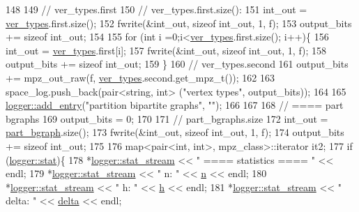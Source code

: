 \begin{DoxyCode}
148 
149   \textcolor{comment}{// ver\_types.first}
150   \textcolor{comment}{// ver\_types.first.size():}
151   int\_out = \hyperlink{classmarked__graph__compressed_af446cc5e23c241a92b76642fd5ebc403}{ver\_types}.first.size();
152   fwrite(&int\_out, \textcolor{keyword}{sizeof} int\_out, 1, f);
153   output\_bits += \textcolor{keyword}{sizeof} int\_out;
154 
155   \textcolor{keywordflow}{for} (\textcolor{keywordtype}{int} i =0;i<\hyperlink{classmarked__graph__compressed_af446cc5e23c241a92b76642fd5ebc403}{ver\_types}.first.size(); i++)\{
156     int\_out = \hyperlink{classmarked__graph__compressed_af446cc5e23c241a92b76642fd5ebc403}{ver\_types}.first[i];
157     fwrite(&int\_out, \textcolor{keyword}{sizeof} int\_out, 1, f);
158     output\_bits += \textcolor{keyword}{sizeof} int\_out;
159   \}
160   \textcolor{comment}{// ver\_types.second}
161   output\_bits += mpz\_out\_raw(f, \hyperlink{classmarked__graph__compressed_af446cc5e23c241a92b76642fd5ebc403}{ver\_types}.second.get\_mpz\_t());
162 
163   space\_log.push\_back(pair<string, int> (\textcolor{stringliteral}{"vertex types"}, output\_bits));
164 
165   \hyperlink{classlogger_a710163deb17bc81f70d53d285b8ac9ac}{logger::add\_entry}(\textcolor{stringliteral}{"partition bipartite graphs"}, \textcolor{stringliteral}{""});
166   
167 
168   \textcolor{comment}{// ==== part bgraphs}
169   output\_bits = 0;
170 
171   \textcolor{comment}{// part\_bgraphs.size}
172   int\_out = \hyperlink{classmarked__graph__compressed_a7b3267063fba30b45eb21b3ba4e07536}{part\_bgraph}.size();
173   fwrite(&int\_out, \textcolor{keyword}{sizeof} int\_out, 1, f);
174   output\_bits += \textcolor{keyword}{sizeof} int\_out;
175 
176   map<pair<int, int>, mpz\_class>::iterator it2;
177   \textcolor{keywordflow}{if} (\hyperlink{classlogger_a26812b5ba03f130e8dae3446d5fc032f}{logger::stat})\{
178     *\hyperlink{classlogger_a7db37821f875f2ba3540980b355779f5}{logger::stat\_stream} << \textcolor{stringliteral}{" ==== statistics ==== "} << endl;
179     *\hyperlink{classlogger_a7db37821f875f2ba3540980b355779f5}{logger::stat\_stream} << \textcolor{stringliteral}{" n:                "} << \hyperlink{classmarked__graph__compressed_a8d841016ddb11cfd33748c8deb6277ba}{n} << endl;
180     *\hyperlink{classlogger_a7db37821f875f2ba3540980b355779f5}{logger::stat\_stream} << \textcolor{stringliteral}{" h:                "} << \hyperlink{classmarked__graph__compressed_af6ff623407b673d08d0cab77b39c2193}{h} << endl;
181     *\hyperlink{classlogger_a7db37821f875f2ba3540980b355779f5}{logger::stat\_stream} << \textcolor{stringliteral}{" delta:            "} << \hyperlink{classmarked__graph__compressed_a8b2aaac68e9332ddc78d88eb60b323a7}{delta} << endl;

\end{DoxyCode}
